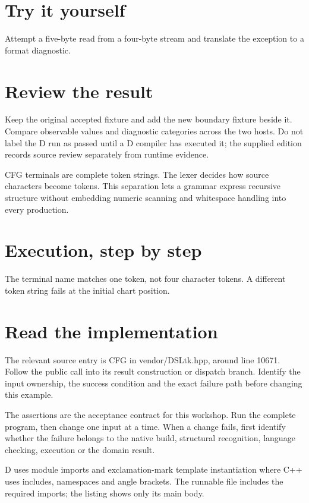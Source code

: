 \section*{Try it yourself}
Attempt a five-byte read from a four-byte stream and translate the exception to a format diagnostic.

\section*{Review the result}
Keep the original accepted fixture and add the new boundary fixture beside it. Compare observable values and diagnostic categories across the two hosts. Do not label the D run as passed until a D compiler has executed it; the supplied edition records source review separately from runtime evidence.

\clearpage
{}
CFG terminals are complete token strings. The lexer decides how source characters become tokens. This separation lets a grammar express recursive structure without embedding numeric scanning and whitespace handling into every production.


\section*{Execution, step by step}
The terminal name matches one token, not four character tokens. A different token string fails at the initial chart position.

\section*{Read the implementation}
The relevant source entry is CFG in vendor/DSLtk.hpp, around line 10671. Follow the public call into its result construction or dispatch branch. Identify the input ownership, the success condition and the exact failure path before changing this example.

The assertions are the acceptance contract for this workshop. Run the complete program, then change one input at a time. When a change fails, first identify whether the failure belongs to the native build, structural recognition, language checking, execution or the domain result.

\clearpage
{}
D uses module imports and exclamation-mark template instantiation where C++ uses includes, namespaces and angle brackets. The runnable file includes the required imports; the listing shows only its main body.

